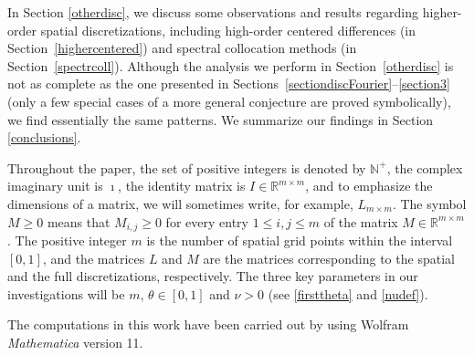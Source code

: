 \documentclass[smallextended,numbook,runningheads]{svjour3}     %
\newcommand{\dt}{\Delta t}
\newcommand{\dx}{\Delta x}
\newcommand{\nplus}{\mathbb{N}^+}
\newcommand{\rr}{\mathbb{R}}
\begin{document}
In Section \ref{otherdisc}, we discuss some observations and results regarding
higher-order spatial discretizations, including high-order centered differences
(in Section~\ref{highercentered}) and spectral collocation methods (in Section~\ref{spectrcoll}). Although the analysis we perform in Section~\ref{otherdisc} is not as complete as the one presented in Sections~\ref{sectiondiscFourier}--\ref{section3} (only a few special cases of a more general conjecture are proved symbolically), we find essentially the same patterns. 
We summarize our findings in Section \ref{conclusions}.

Throughout the paper, the set of positive integers is denoted by $\nplus$, the complex imaginary unit is $\imath$, the identity matrix is $I\in\rr^{m\times m}$, and to emphasize the dimensions of a matrix, we will sometimes write, for example, $L_{m\times m}$.
The symbol $M\ge 0$ means that  $M_{i,j}\ge 0$ for every entry $1\le i, j\le m$ of the matrix $M\in\mathbb{R}^{m\times m}$. The positive integer $m$ is the number of spatial grid points within the interval $[0,1]$, and the matrices $L$ and $M$ are the matrices corresponding to the spatial and the full discretizations, respectively. The three key parameters in our investigations will be $m$, $\theta\in [0,1]$ and $\nu>0$ (see \eqref{firsttheta} and \eqref{nudef}).

The computations in this work have been carried out by using Wolfram \textit{Mathematica} version 11.






\end{document}
